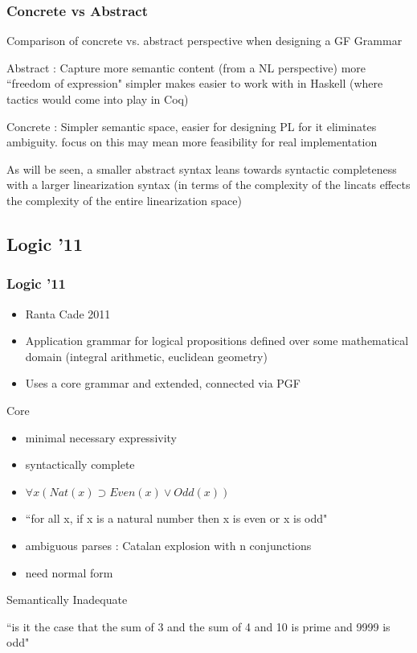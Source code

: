 \documentclass[10pt]{beamer}
\begin{document}
\begin{frame}
\frametitle{Concrete vs Abstract}

Comparison of concrete vs. abstract perspective when designing a GF Grammar

Abstract : Capture more semantic content (from a NL perspective) more ``freedom
of expression"
simpler makes easier to work with in Haskell (where tactics would come into play
in Coq)
  
Concrete : Simpler semantic space, easier for designing PL for it eliminates ambiguity.
focus on this may mean more feasibility  for real implementation

As will be seen, a smaller abstract syntax leans towards syntactic completeness
with a larger linearization syntax (in terms of the complexity of the lincats
effects the complexity of the entire linearization space)

\end{frame}

\subsection{Logic '11}

\begin{frame}
\frametitle{Logic '11}

\begin{itemize}
\item Ranta Cade 2011
\item Application grammar for logical propositions defined over some mathematical
domain (integral arithmetic, euclidean geometry) 
\item Uses a core grammar and extended, connected via PGF
\end{itemize}

\end{frame}

\begin{frame}

\begin{block}{Core}
\begin{itemize}
\item minimal necessary expressivity 
\item syntactically complete
\item $\forall x (Nat(x) \supset Even(x) \lor Odd(x))$
\item ``for all x, if x is a natural number then x is even or x is odd"
\item ambiguous parses : Catalan explosion with n conjunctions
\item need normal form
\end{itemize}
\end{block}

\begin{exampleblock}{Semantically Inadequate}

``is it the case that the sum of 3 and the sum of 4 and 10 is prime and 9999 is odd"

\end{exampleblock}
\end{frame}
\end{document}

